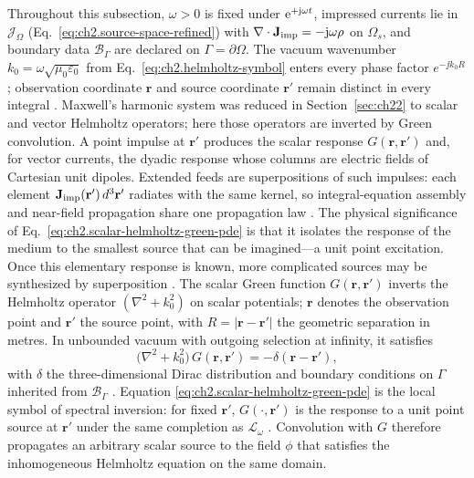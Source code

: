 Throughout this subsection, $\omega>0$ is fixed under $\mathrm{e}^{+\mathrm{j}\omega t}$, impressed currents lie in
$\mathcal{J}_\Omega$ (Eq.~\eqref{eq:ch2.source-space-refined}) with
$\nabla\cdot\mathbf{J}_{\mathrm{imp}}=-\mathrm{j}\omega\rho$ on $\Omega_s$, and boundary data $\mathcal{B}_\Gamma$ are
declared on $\Gamma=\partial\Omega$.
The vacuum wavenumber $k_0=\omega\sqrt{\mu_0\varepsilon_0}$ from Eq.~\eqref{eq:ch2.helmholtz-symbol}
enters every phase factor $e^{-\jj k_0 R}$; observation coordinate $\mathbf{r}$ and source coordinate
$\mathbf{r}'$ remain distinct in every integral \cite{stratton1941,jackson1999}.
Maxwell's harmonic system was reduced in Section~\ref{sec:ch22} to scalar and vector Helmholtz
operators; here those operators are inverted by Green convolution.
A point impulse at $\mathbf{r}'$ produces the scalar response $G(\mathbf{r},\mathbf{r}')$ and,
for vector currents, the dyadic response whose columns are electric fields of Cartesian unit
dipoles.
Extended feeds are superpositions of such impulses: each element $\mathbf{J}_{\mathrm{imp}}(\mathbf{r}')\,d^{3}\mathbf{r}'$
radiates with the same kernel, so integral-equation assembly and near-field propagation share one
propagation law \cite{harrington2001}.
The physical significance of Eq.~\eqref{eq:ch2.scalar-helmholtz-green-pde} is that it isolates
the response of the medium to the smallest source that can be imagined---a unit point excitation.
Once this elementary response is known, more complicated sources may be synthesized by
superposition \cite{jackson1999}. The scalar Green function $G(\mathbf{r},\mathbf{r}')$
inverts the Helmholtz operator $(\nabla^2+k_0^2)$ on scalar potentials; $\mathbf{r}$ denotes
the observation point and $\mathbf{r}'$ the source point, with $R=|\mathbf{r}-\mathbf{r}'|$
the geometric separation in metres. In unbounded vacuum with outgoing selection at infinity, it satisfies
\begin{equation}
\label{eq:ch2.scalar-helmholtz-green-pde}
\big(\nabla^{2}+k_0^{2}\big)\,G(\mathbf{r},\mathbf{r}')
=
-\delta(\mathbf{r}-\mathbf{r}'),
\end{equation}
with \(\delta\) the three-dimensional Dirac distribution and boundary conditions on
\(\Gamma\) inherited from \(\mathcal{B}_\Gamma\) \cite{stratton1941}. Equation
\eqref{eq:ch2.scalar-helmholtz-green-pde} is the local symbol of spectral inversion:
for fixed \(\mathbf{r}'\), \(G(\cdot,\mathbf{r}')\) is the response to a unit point
source at \(\mathbf{r}'\) under the same completion as \(\mathcal{L}_\omega\)
\cite{jackson1999}. Convolution with \(G\) therefore propagates an arbitrary scalar source
to the field \(\phi\) that satisfies the inhomogeneous Helmholtz equation on the same domain.
